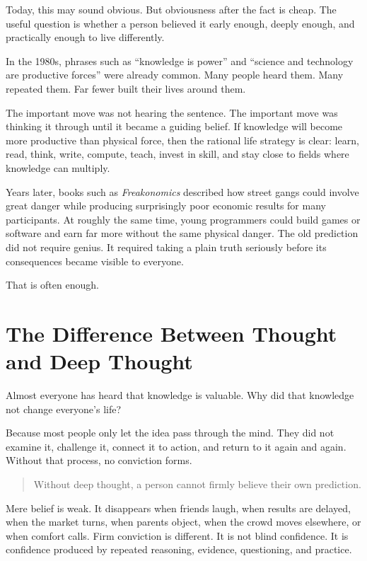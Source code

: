Today, this may sound obvious. But obviousness after the fact is cheap. The useful question is whether a person believed it early enough, deeply enough, and practically enough to live differently.

In the 1980s, phrases such as ``knowledge is power'' and ``science and technology are productive forces'' were already common. Many people heard them. Many repeated them. Far fewer built their lives around them.

The important move was not hearing the sentence. The important move was thinking it through until it became a guiding belief. If knowledge will become more productive than physical force, then the rational life strategy is clear: learn, read, think, write, compute, teach, invest in skill, and stay close to fields where knowledge can multiply.

Years later, books such as \emph{Freakonomics} described how street gangs could involve great danger while producing surprisingly poor economic results for many participants. At roughly the same time, young programmers could build games or software and earn far more without the same physical danger. The old prediction did not require genius. It required taking a plain truth seriously before its consequences became visible to everyone.

That is often enough.

\section*{The Difference Between Thought and Deep Thought}

Almost everyone has heard that knowledge is valuable. Why did that knowledge not change everyone's life?

Because most people only let the idea pass through the mind. They did not examine it, challenge it, connect it to action, and return to it again and again. Without that process, no conviction forms.

\begin{quote}
Without deep thought, a person cannot firmly believe their own prediction.
\end{quote}

Mere belief is weak. It disappears when friends laugh, when results are delayed, when the market turns, when parents object, when the crowd moves elsewhere, or when comfort calls. Firm conviction is different. It is not blind confidence. It is confidence produced by repeated reasoning, evidence, questioning, and practice.

